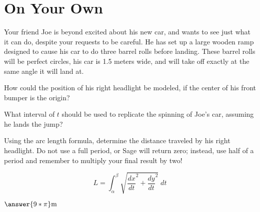 \documentclass{ximera}
\begin{document}
\section{On Your Own}
\begin{question}
\item Your friend Joe is beyond excited about his new car, and wants to see just what it can do, despite your requests to be careful. He has set up a large wooden ramp designed to cause his car to do three barrel rolls before landing. These barrel rolls will be perfect circles, his car is 1.5 meters wide, and will take off exactly at the same angle it will land at.

How could the position of his right headlight be modeled, if the center of his front bumper is the origin?

\begin{multipleChoice}
\end{multipleChoice}

What interval of $t$ should be used to replicate the spinning of Joe's car, assuming he lands the jump?

\begin{multipleChoice}
\end{multipleChoice}

Using the arc length formula, determine the distance traveled by his right headlight. Do not use a full period, or Sage will return zero; instead, use half of a period and remember to multiply your final result by two!

$$L = \int_\alpha^\beta \sqrt{\dfrac{dx}{dt}^2 + \dfrac{dy}{dt}^2} \;dt$$

\begin{onlineOnly}
\begin{sageCell}

\end{sageCell}
\end{onlineOnly}
\begin{center}
$\answer{9*\pi}\text{m}$
\end{center}
\end{question}
\end{document}
